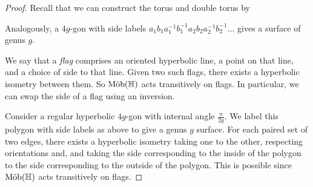 \begin{proof}
	Recall that we can construct the torus and double torus by
	\begin{center}
		\quad
	\end{center}
	Analogously, a \( 4g \)-gon with side labels \( a_1 b_1 a_1^{-1} b_1^{-1} a_2 b_2 a_2^{-1} b_2^{-1} \dots \) gives a surface of genus \( g \).

	We say that a \textit{flag} comprises an oriented hyperbolic line, a point on that line, and a choice of side to that line.
	Given two such flags, there exists a hyperbolic isometry between them.
	So \( \text{M\"ob}(\mathbb H) \) acts transitively on flags.
	In particular, we can swap the side of a flag using an inversion.

	Consider a regular hyperbolic \( 4g \)-gon with internal angle \( \frac{\pi}{2g} \).
	We label this polygon with side labels as above to give a genus \( g \) surface.
	For each paired set of two edges, there exists a hyperbolic isometry taking one to the other, respecting orientations and, and taking the side corresponding to the inside of the polygon to the side corresponding to the outside of the polygon.
	This is possible since \( \text{M\"ob}(\mathbb H) \) acts transitively on flags.


\end{proof}
